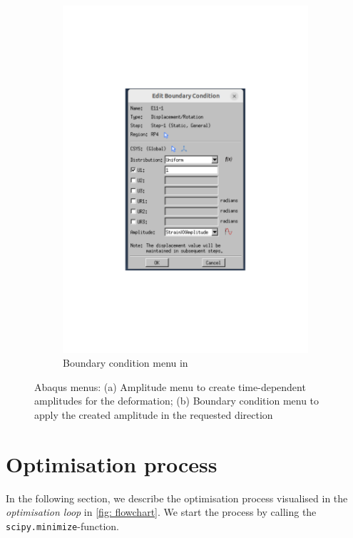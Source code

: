 \begin{figure}[H]
\begin{subfigure}[t]{0.35\textwidth}
        \includegraphics[width=\linewidth]{BC.pdf}
        \caption{Boundary condition menu in }
        \label{fig:bcmenu}
    \end{subfigure}

    \caption{Abaqus menus: (a) Amplitude menu to create time-dependent amplitudes for the deformation; (b) Boundary condition menu to apply the created amplitude in the requested direction}
    \label{fig:abaqus_settings}
\end{figure}
\newpage
\section{Optimisation process} \label{sec: optimisationCode}





In the following section, we describe the optimisation process visualised in the \emph{optimisation loop} in \autoref{fig: flowchart}. We start the process by calling the \verb|scipy.minimize|-function. 

